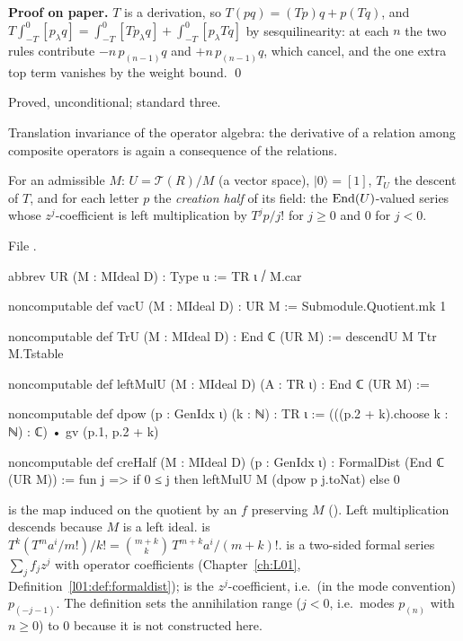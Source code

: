 \textbf{Proof on paper.} $T$ is a derivation, so $T(pq) = (Tp)q+p(Tq)$, and $T\int_{-T}^0[p_\lambda q] =
\int_{-T}^0[Tp_\lambda q]+\int_{-T}^0[p_\lambda Tq]$ by sesquilinearity: at each $n$ the two rules contribute $-n\,p_{(n-1)}q$ and
$+n\,p_{(n-1)}q$, which cancel, and the one extra top term vanishes by the weight bound. \qed

\begin{status}
Proved, unconditional; standard three.
\end{status}

\begin{physics}
Translation invariance of the operator algebra: the derivative of a relation among composite operators is again a
consequence of the relations.
\end{physics}

\begin{definition}[The quotient $U = \mathcal T(R)/M$, vacuum, translation, creation half]\label{l11:def:UR}
For an admissible $M$: $U = \mathcal T(R)/M$ (a vector space), $|0\rangle = [1]$, $T_U$ the descent of $T$, and for each letter $p$
the \emph{creation half} of its field: the $\operatorname{End}(U)$-valued series whose $z^j$-coefficient is left multiplication by
$T^j p/j!$ for $j\ge0$ and $0$ for $j<0$.
\end{definition}
\noindent File .
\begin{leancode}
abbrev UR (M : MIdeal D) : Type u := TR ι ⧸ M.car

noncomputable def vacU (M : MIdeal D) : UR M := Submodule.Quotient.mk 1

noncomputable def TrU (M : MIdeal D) : End ℂ (UR M) := descendU M Ttr M.Tstable

noncomputable def leftMulU (M : MIdeal D) (A : TR ι) : End ℂ (UR M) :=

noncomputable def dpow (p : GenIdx ι) (k : ℕ) : TR ι :=
  (((p.2 + k).choose k : ℕ) : ℂ) • gv (p.1, p.2 + k)

noncomputable def creHalf (M : MIdeal D) (p : GenIdx ι) : FormalDist (End ℂ (UR M)) :=
  fun j => if 0 ≤ j then leftMulU M (dpow p j.toNat) else 0
\end{leancode}

\begin{dictionary}
 is the map induced on the quotient by an $f$ preserving $M$ (). Left
multiplication descends because $M$ is a left ideal.  is $T^k(T^ma^i/m!)/k! = \binom{m+k}{k}\,T^{m+k}a^i/(m+k)!$.
 is a two-sided formal series $\sum_jf_jz^j$ with operator coefficients
(Chapter~\ref{ch:L01}, Definition~\ref{l01:def:formaldist});  is the $z^j$-coefficient, i.e.\ (in the mode
convention) $p_{(-j-1)}$. The definition sets the annihilation range ($j<0$, i.e.\ modes $p_{(n)}$ with $n\ge0$) to $0$
because it is not constructed here.
\end{dictionary}

